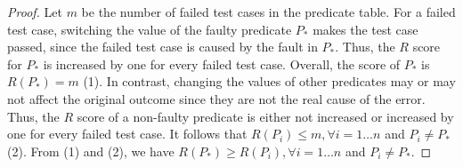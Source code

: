 \begin{proof}
Let $m$ be the number of failed test cases in the predicate table. For
a failed test case, switching the value of the faulty predicate $P_*$
makes the test case passed, since the failed test case is caused by
the fault in $P_*$. Thus, the $R$ score for $P_*$ is increased by
one for every failed test case. Overall, the score of
$P_*$ is $R(P_*) = m$ (1). In contrast, changing the values of other
predicates may or may not affect the original outcome since they are
not the real cause of the error. Thus, the $R$ score of a non-faulty
predicate is either not increased or increased by one for every failed
test case. It follows that $R(P_i) \le m, \forall i = 1 \ldots n$ and
$P_i \neq P_*$ (2). From (1) and (2), we have $R(P_*) \ge
R(P_i), \forall i = 1 \ldots n$ and $P_i \neq P_*$.
\end{proof}

 